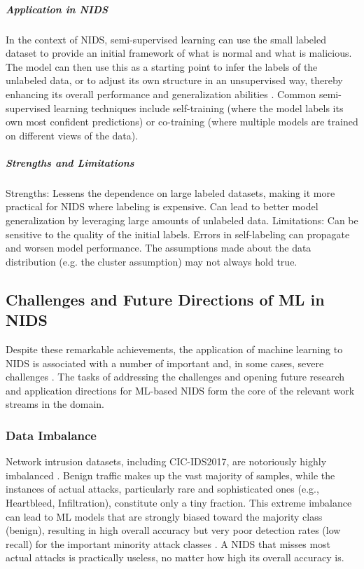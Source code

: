 \subparagraph{Application in NIDS} 
In the context of NIDS, semi-supervised learning can use the small labeled dataset to provide an initial framework of what is normal and what is malicious. The model can then use this as a starting point to infer the labels of the unlabeled data, or to adjust its own structure in an unsupervised way, thereby enhancing its overall performance and generalization abilities \parencite {zou2021survey}. Common semi-supervised learning techniques include self-training (where the model labels its own most confident predictions) or co-training (where multiple models are trained on different views of the data).

\subparagraph{Strengths and Limitations} 
Strengths: Lessens the dependence on large labeled datasets, making it more practical for NIDS where labeling is expensive. Can lead to better model generalization by leveraging large amounts of unlabeled data.
Limitations: Can be sensitive to the quality of the initial labels. Errors in self-labeling can propagate and worsen model performance. The assumptions made about the data distribution (e.g. the cluster assumption) may not always hold true.

\subsection{Challenges and Future Directions of ML in NIDS}
Despite these remarkable achievements, the application of machine learning to NIDS is associated with a number of important and, in some cases, severe challenges \parencite{sharafaldin2018survey, al2020comprehensive}. The tasks of addressing the challenges and opening future research and application directions for ML-based NIDS form the core of the relevant work streams in the domain.

\subsubsection{Data Imbalance}\label{bg_imbalance}
Network intrusion datasets, including CIC-IDS2017, are notoriously highly imbalanced \parencite{sharafaldin2018toward1}. Benign traffic makes up the vast majority of samples, while the instances of actual attacks, particularly rare and sophisticated ones (e.g., Heartbleed, Infiltration), constitute only a tiny fraction. This extreme imbalance can lead to ML models that are strongly biased toward the majority class (benign), resulting in high overall accuracy but very poor detection rates (low recall) for the important minority attack classes \parencite{agrawal2021survey}. A NIDS that misses most actual attacks is practically useless, no matter how high its overall accuracy is.

